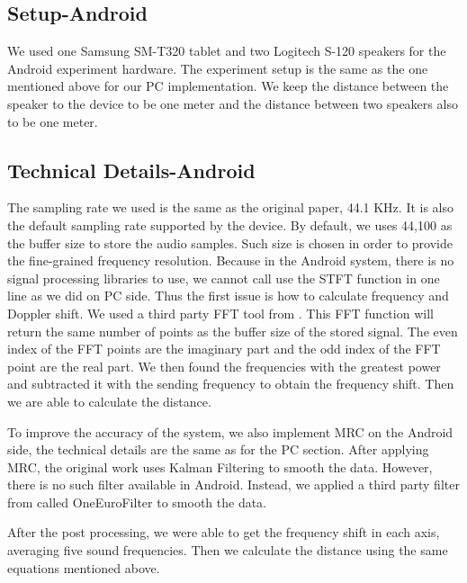 \documentclass{acm_proc_article-sp}
\begin{document}
\subsection{Setup-Android}
We used one Samsung SM-T320 tablet and two Logitech S-120 speakers for the Android experiment 
hardware. The experiment setup is the same as the one mentioned above for our PC 
implementation. We keep the distance between the speaker to the device to be one meter
and the distance between two speakers also to be one meter. 

\subsection{Technical Details-Android}
The sampling rate we used is the same as the original paper, 44.1 KHz. It is also the 
default sampling rate supported by the device. By default, we uses 44,100 as the buffer
size to store the audio samples. Such size is chosen in order to provide the fine-grained
frequency resolution.
Because in the Android system, there is no signal processing libraries to use, we cannot 
call use the STFT function in one line as we did on PC side. Thus the first issue is how to 
calculate frequency and Doppler shift. We used a third party FFT tool from 
\cite{FFT}. This FFT function will return the same number of points as the buffer size
of the stored signal. The even index of the FFT points are the imaginary part and the odd 
index of the FFT point are the real part. We then found the frequencies with the greatest
power and subtracted it with the sending frequency to obtain the frequency shift. 
Then we are able to calculate the distance. 

To improve the accuracy of the system, we also implement MRC on the Android side, the 
technical details are the same as for the PC section. After applying MRC, the original
work uses Kalman Filtering to smooth the data. However, there is no such filter available in
Android. Instead, we applied a third party filter from
\cite{SignalFilter} called OneEuroFilter to smooth the data.

After the post processing, we were able to get the frequency shift in each axis, averaging
five sound frequencies. Then we calculate the distance using the same equations mentioned
above.
\end{document}
